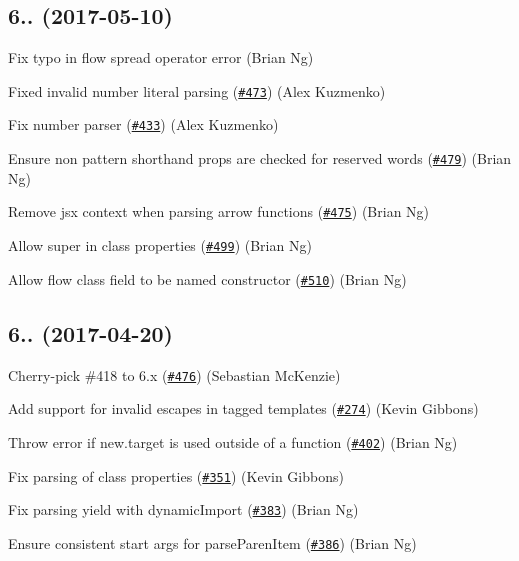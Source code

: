 \subsection*{6.. (2017-\/05-\/10)}


\begin{DoxyItemize}
\item Fix typo in flow spread operator error (Brian Ng)
\item Fixed invalid number literal parsing (\href{https://github.com/babel/babylon/pull/473}{\tt \#473}) (Alex Kuzmenko)
\item Fix number parser (\href{https://github.com/babel/babylon/pull/433}{\tt \#433}) (Alex Kuzmenko)
\item Ensure non pattern shorthand props are checked for reserved words (\href{https://github.com/babel/babylon/pull/479}{\tt \#479}) (Brian Ng)
\item Remove jsx context when parsing arrow functions (\href{https://github.com/babel/babylon/pull/475}{\tt \#475}) (Brian Ng)
\item Allow super in class properties (\href{https://github.com/babel/babylon/pull/499}{\tt \#499}) (Brian Ng)
\item Allow flow class field to be named constructor (\href{https://github.com/babel/babylon/pull/510}{\tt \#510}) (Brian Ng)
\end{DoxyItemize}

\subsection*{6.. (2017-\/04-\/20)}


\begin{DoxyItemize}
\item Cherry-\/pick \#418 to 6.\+x (\href{https://github.com/babel/babylon/pull/476}{\tt \#476}) (Sebastian Mc\+Kenzie)
\item Add support for invalid escapes in tagged templates (\href{https://github.com/babel/babylon/pull/274}{\tt \#274}) (Kevin Gibbons)
\item Throw error if new.\+target is used outside of a function (\href{https://github.com/babel/babylon/pull/402}{\tt \#402}) (Brian Ng)
\item Fix parsing of class properties (\href{https://github.com/babel/babylon/pull/351}{\tt \#351}) (Kevin Gibbons)
\item Fix parsing yield with dynamic\+Import (\href{https://github.com/babel/babylon/pull/383}{\tt \#383}) (Brian Ng)
\item Ensure consistent start args for parse\+Paren\+Item (\href{https://github.com/babel/babylon/pull/386}{\tt \#386}) (Brian Ng)
\end{DoxyItemize}

